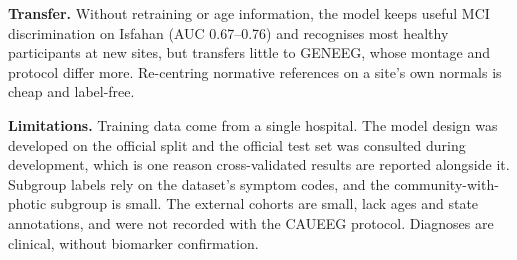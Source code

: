 \textbf{Transfer.} Without retraining or age information, the model keeps useful MCI discrimination on Isfahan
(AUC 0.67--0.76) and recognises most healthy participants at new sites, but transfers little to GENEEG, whose
montage and protocol differ more. Re-centring normative references on a site's own normals is cheap and
label-free.

\textbf{Limitations.} Training data come from a single hospital. The model design was developed on the
official split and the official test set was consulted during development, which is one reason
cross-validated results are reported alongside it. Subgroup labels rely on the dataset's symptom codes, and the
community-with-photic subgroup is small. The external cohorts are small, lack ages and state annotations, and
were not recorded with the CAUEEG protocol. Diagnoses are clinical, without biomarker confirmation.
